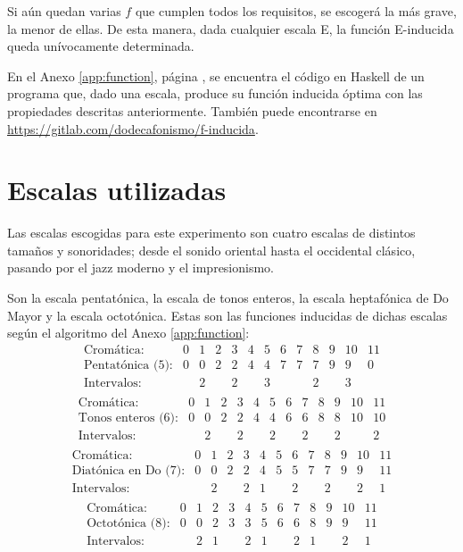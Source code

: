 		Si aún quedan varias $f$ que cumplen todos los requisitos, se escogerá la más grave, la menor de ellas. De esta manera, dada cualquier escala E, la función E-inducida queda unívocamente determinada.
		
		En el Anexo \ref{app:function}, página \pageref{app:function}, se encuentra el código en Haskell de un programa que, dado una escala, produce su función inducida óptima con las propiedades descritas anteriormente. También puede encontrarse en \url{https://gitlab.com/dodecafonismo/f-inducida}.
		
		\section{Escalas utilizadas}
		
		Las escalas escogidas para este experimento son cuatro escalas de distintos tamaños y sonoridades; desde el sonido oriental hasta el occidental clásico, pasando por el jazz moderno y el impresionismo.
		
		Son la escala pentatónica, la escala de tonos enteros, la escala heptafónica de Do Mayor y la escala octotónica. Estas son las funciones inducidas de dichas escalas según el algoritmo del Anexo \ref{app:function}:
		\[\left.\begin{matrix}
		\text{Cromática:}&0&1&2&3&4&5&6&7&8&9&10&11\\
		\text{Pentatónica (5):}&0&0&2&2&4&4&7&7&7&9&9&0\\
		\text{Intervalos:}&&2&&2&&3&&&2&&3&\\
		\end{matrix}\right.\]		
		\[\left.\begin{matrix}
		\text{Cromática:}&0&1&2&3&4&5&6&7&8&9&10&11\\
		\text{Tonos enteros (6):}&0&0&2&2&4&4&6&6&8&8&10&10\\
		\text{Intervalos:}&&2&&2&&2&&2&&2&&2\\
		\end{matrix}\right.\]
		\[\left.\begin{matrix}
		\text{Cromática:}&0&1&2&3&4&5&6&7&8&9&10&11\\
		\text{Diatónica en Do (7):}&0&0&2&2&4&5&5&7&7&9&9&11\\
		\text{Intervalos:}&&2&&2&1&&2&&2&&2&1\\
		\end{matrix}\right.\]        
		\[\left.\begin{matrix}
		\text{Cromática:}&0&1&2&3&4&5&6&7&8&9&10&11\\
		\text{Octotónica (8):}&0&0&2&3&3&5&6&6&8&9&9&11\\
		\text{Intervalos:}&&2&1&&2&1&&2&1&&2&1\\
		\end{matrix}\right.\]